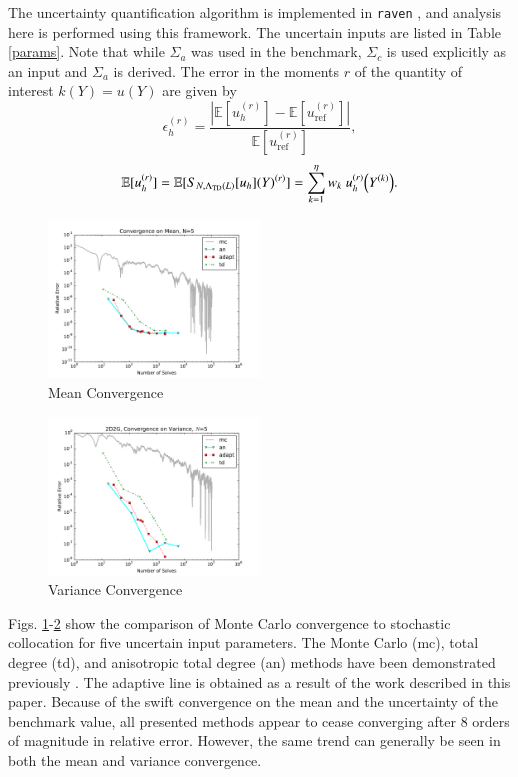 \documentclass{anstrans} \usepackage{amsmath} \usepackage{amssymb}
\newcommand{\expv}[1]{\ensuremath{\mathbb{E}[ #1]}} \newcommand{\xs}[2]{\ensuremath{\Sigma_{#1}^{(#2)}}}
\begin{document}
The uncertainty quantification algorithm is implemented in \texttt{raven} \cite{raven}, and analysis here is performed
using this framework.  The uncertain inputs are listed in Table \ref{params}.  Note that while $\Sigma_a$
was used in the benchmark, $\Sigma_c$ is used explicitly as an input and $\Sigma_a$ is derived.
The error in the moments $r$ of the quantity of interest $k(Y)=u(Y)$ are given by
\begin{equation}
  \epsilon_h^{(r)}=\frac{|\expv{u_h^{(r)}}-\expv{u_\text{ref}^{(r)}}|}{\expv{u_\text{ref}^{(r)}}},
\end{equation}
\begin{equation}
  \expv{u_h^{(r)}}=\expv{S_{N,\Lambda_\text{TD}(L)}[u_h](Y)^{(r)}}=\sum_{k=1}^\eta w_k
  ~u_h^{(r)}\qty(Y^{(k)}).
\end{equation}

\begin{figure}[H]
  \centering
  \includegraphics[width=0.5\textwidth]{../graphics/2D2G_meanconv_aniso_5}
  \caption{Mean Convergence}
  \label{mean}
\end{figure}
\begin{figure}[H]
  \centering
  \includegraphics[width=0.5\textwidth]{../graphics/2D2G_varconv_aniso_5}
  \caption{Variance Convergence}
  \label{variance}
\end{figure}
Figs. \ref{mean}-\ref{variance} show the comparison of Monte Carlo convergence to stochastic collocation for
five uncertain input parameters.  The Monte Carlo (mc), total degree (td), and anisotropic total degree (an)
methods have been demonstrated previously \cite{ans2014}.  The adaptive line is obtained as a result of the
work described in this paper.  Because of the swift convergence on the mean and the uncertainty of the
benchmark value, all presented methods appear to cease converging after 8 orders of magnitude in relative
error.  However, the same trend can generally be seen in both the mean and variance convergence.  
\end{document}

